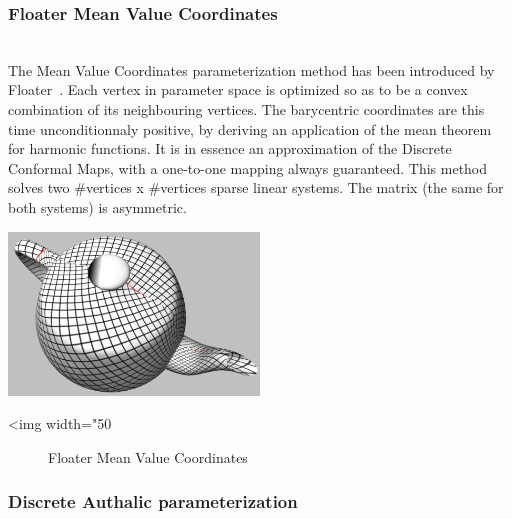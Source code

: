 \subsubsection{Floater Mean Value Coordinates}

  \\

The Mean Value Coordinates parameterization method has been introduced
by Floater~\cite{cgal:f-mvc-03}. Each vertex in parameter space is
optimized so as to be a convex combination of its neighbouring
vertices. The barycentric coordinates are this time unconditionnaly
positive, by deriving an application of the mean theorem for harmonic
functions. It is in essence an approximation of the Discrete Conformal
Maps, with a one-to-one mapping always guaranteed. This method solves
two \#vertices x \#vertices sparse linear systems. The matrix (the
same for both systems) is asymmetric.

\begin{center}
    \label{Surface_mesh_parameterization-fig-floater}
    \begin{ccTexOnly}
        \includegraphics[width=0.5\textwidth]{Surface_mesh_parameterization/floater} %
    \end{ccTexOnly}
    \begin{ccHtmlOnly}
        <img width="50%
    \end{ccHtmlOnly}
    \begin{figure}[h]
        \caption{Floater Mean Value Coordinates}
    \end{figure}
\end{center}


\subsubsection{Discrete Authalic parameterization}

